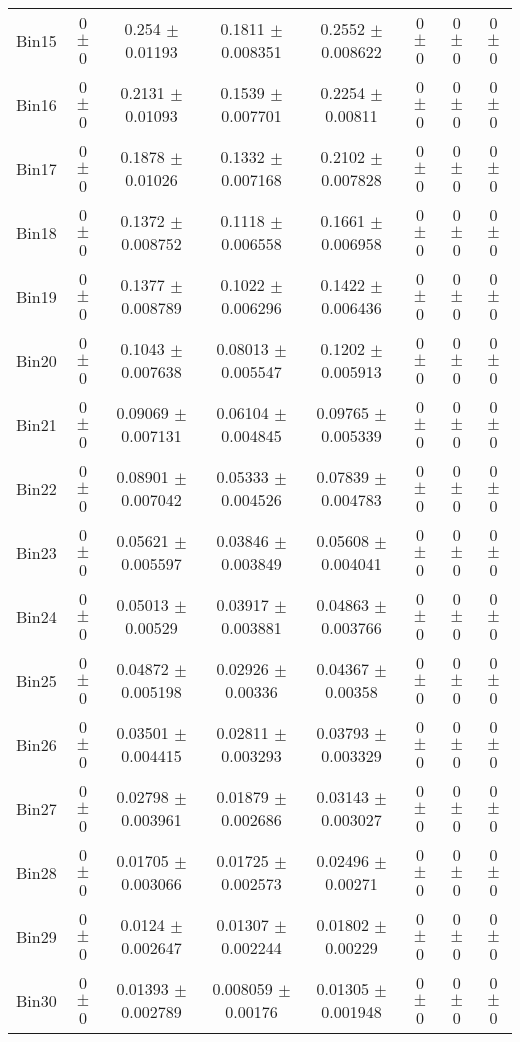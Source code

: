 \begin{tabular}{@{\extracolsep{4pt}}lccccccc@{}}
     Bin15 & 0 $\pm$ 0 & 0.254 $\pm$ 0.01193 & 0.1811 $\pm$ 0.008351 & 0.2552 $\pm$ 0.008622 & 0 $\pm$ 0 & 0 $\pm$ 0 & 0 $\pm$ 0 \\ 
     Bin16 & 0 $\pm$ 0 & 0.2131 $\pm$ 0.01093 & 0.1539 $\pm$ 0.007701 & 0.2254 $\pm$ 0.00811 & 0 $\pm$ 0 & 0 $\pm$ 0 & 0 $\pm$ 0 \\ 
     Bin17 & 0 $\pm$ 0 & 0.1878 $\pm$ 0.01026 & 0.1332 $\pm$ 0.007168 & 0.2102 $\pm$ 0.007828 & 0 $\pm$ 0 & 0 $\pm$ 0 & 0 $\pm$ 0 \\ 
     Bin18 & 0 $\pm$ 0 & 0.1372 $\pm$ 0.008752 & 0.1118 $\pm$ 0.006558 & 0.1661 $\pm$ 0.006958 & 0 $\pm$ 0 & 0 $\pm$ 0 & 0 $\pm$ 0 \\ 
     Bin19 & 0 $\pm$ 0 & 0.1377 $\pm$ 0.008789 & 0.1022 $\pm$ 0.006296 & 0.1422 $\pm$ 0.006436 & 0 $\pm$ 0 & 0 $\pm$ 0 & 0 $\pm$ 0 \\ 
     Bin20 & 0 $\pm$ 0 & 0.1043 $\pm$ 0.007638 & 0.08013 $\pm$ 0.005547 & 0.1202 $\pm$ 0.005913 & 0 $\pm$ 0 & 0 $\pm$ 0 & 0 $\pm$ 0 \\ 
     Bin21 & 0 $\pm$ 0 & 0.09069 $\pm$ 0.007131 & 0.06104 $\pm$ 0.004845 & 0.09765 $\pm$ 0.005339 & 0 $\pm$ 0 & 0 $\pm$ 0 & 0 $\pm$ 0 \\ 
     Bin22 & 0 $\pm$ 0 & 0.08901 $\pm$ 0.007042 & 0.05333 $\pm$ 0.004526 & 0.07839 $\pm$ 0.004783 & 0 $\pm$ 0 & 0 $\pm$ 0 & 0 $\pm$ 0 \\ 
     Bin23 & 0 $\pm$ 0 & 0.05621 $\pm$ 0.005597 & 0.03846 $\pm$ 0.003849 & 0.05608 $\pm$ 0.004041 & 0 $\pm$ 0 & 0 $\pm$ 0 & 0 $\pm$ 0 \\ 
     Bin24 & 0 $\pm$ 0 & 0.05013 $\pm$ 0.00529 & 0.03917 $\pm$ 0.003881 & 0.04863 $\pm$ 0.003766 & 0 $\pm$ 0 & 0 $\pm$ 0 & 0 $\pm$ 0 \\ 
     Bin25 & 0 $\pm$ 0 & 0.04872 $\pm$ 0.005198 & 0.02926 $\pm$ 0.00336 & 0.04367 $\pm$ 0.00358 & 0 $\pm$ 0 & 0 $\pm$ 0 & 0 $\pm$ 0 \\ 
     Bin26 & 0 $\pm$ 0 & 0.03501 $\pm$ 0.004415 & 0.02811 $\pm$ 0.003293 & 0.03793 $\pm$ 0.003329 & 0 $\pm$ 0 & 0 $\pm$ 0 & 0 $\pm$ 0 \\ 
     Bin27 & 0 $\pm$ 0 & 0.02798 $\pm$ 0.003961 & 0.01879 $\pm$ 0.002686 & 0.03143 $\pm$ 0.003027 & 0 $\pm$ 0 & 0 $\pm$ 0 & 0 $\pm$ 0 \\ 
     Bin28 & 0 $\pm$ 0 & 0.01705 $\pm$ 0.003066 & 0.01725 $\pm$ 0.002573 & 0.02496 $\pm$ 0.00271 & 0 $\pm$ 0 & 0 $\pm$ 0 & 0 $\pm$ 0 \\ 
     Bin29 & 0 $\pm$ 0 & 0.0124 $\pm$ 0.002647 & 0.01307 $\pm$ 0.002244 & 0.01802 $\pm$ 0.00229 & 0 $\pm$ 0 & 0 $\pm$ 0 & 0 $\pm$ 0 \\ 
     Bin30 & 0 $\pm$ 0 & 0.01393 $\pm$ 0.002789 & 0.008059 $\pm$ 0.00176 & 0.01305 $\pm$ 0.001948 & 0 $\pm$ 0 & 0 $\pm$ 0 & 0 $\pm$ 0 \\ 
\hline\hline
  \end{tabular}
